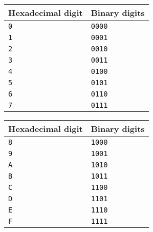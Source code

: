 \documentclass[a4paper,12pt]{article}
\newcommand{\num}[1]{\texttt{#1}}
\begin{document}
\begin{center}
  \begin{tabular}{@{}ll@{}}
    \hline
    Hexadecimal digit & Binary digits \\
    \hline
    \num{0}           & \num{0000}   \\
    \num{1}           & \num{0001}   \\
    \num{2}           & \num{0010}   \\
    \num{3}           & \num{0011}   \\
    \num{4}           & \num{0100}   \\
    \num{5}           & \num{0101}   \\
    \num{6}           & \num{0110}   \\
    \num{7}           & \num{0111}   \\
    \hline
  \end{tabular}
  \hfil
  \begin{tabular}{@{}ll@{}}
    \hline
    Hexadecimal digit & Binary digits \\
    \hline
    \num{8}           & \num{1000}   \\
    \num{9}           & \num{1001}   \\
    \num{A}           & \num{1010}   \\
    \num{B}           & \num{1011}   \\
    \num{C}           & \num{1100}   \\
    \num{D}           & \num{1101}   \\
    \num{E}           & \num{1110}   \\
    \num{F}           & \num{1111}   \\
    \hline
  \end{tabular}
\end{center}
\end{document}
